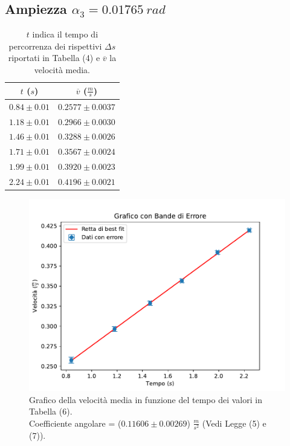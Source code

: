 \documentclass[11pt]{article}
\begin{document}
\subsection{Ampiezza $\alpha_3=0.01765\ rad$}
\begin{table}[H]
\centering
\begin{tabular}{|c|c|}
\hline
\textbf{$t$ ($s$)} & \textbf{$\overline{v}$ ($\frac{m}{s}$)} \\
\hline
$0.84\pm 0.01$ & $0.2577\pm 0.0037$ \\
$1.18\pm 0.01$ & $0.2966\pm 0.0030$ \\
$1.46\pm 0.01$ & $0.3288\pm 0.0026$ \\
$1.71\pm 0.01$ & $0.3567\pm 0.0024$ \\
$1.99\pm 0.01$ & $0.3920\pm 0.0023$ \\
$2.24\pm 0.01$ & $0.4196\pm 0.0021$ \\
\hline
\end{tabular}
\caption{$t$ indica il tempo di percorrenza dei rispettivi $\Delta s$ riportati in Tabella (4) e $\overline{v}$ la velocità media.}
\label{tab:}
\end{table}
\begin{figure}[H]
  \centering
  \includegraphics[width=1\textwidth]{grafico3p1.pdf}
  \caption{Grafico della velocità media in funzione del tempo dei valori in Tabella (6). \\
    Coefficiente angolare = ($0.11606\pm 0.00269$) $\frac{m}{s^2}$ (Vedi Legge (5) e (7)).}
\end{figure}
\end{document}
